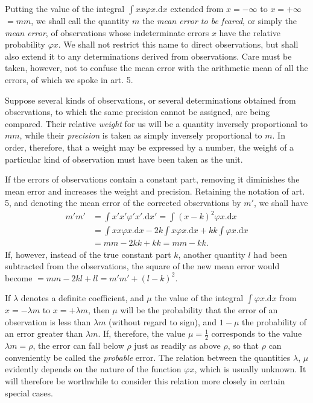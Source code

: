 Putting the value of the integral \(\int xx\varphi x.\mathrm{d}x\) extended from \(x=-\infty\) to \(x=+\infty\) \(=mm\), we shall call the quantity \(m\) the \textit{mean error to be feared}, or simply the \textit{mean error}, of observations whose indeterminate errors \(x\) have the relative probability \(\varphi x\). We shall not restrict this name to direct observations, but shall also extend it to any determinations derived from observations. Care must be taken, however, not to confuse the mean error with the arithmetic mean of all the errors, of which we spoke in art. 5.

Suppose several kinds of observations, or several determinations obtained from observations, to which the same precision cannot be assigned, are being compared. Their relative \textit{weight} for us will be a quantity inversely proportional to \(mm\), while their \textit{precision} is taken as simply inversely proportional to \(m\). In order, therefore, that a weight may be expressed by a number, the weight of a particular kind of observation must have been taken as the unit.

If the errors of observations contain a constant part, removing it diminishes the mean error and increases the weight and precision. Retaining the notation of art. 5, and denoting the mean error of the corrected observations by \(m'\), we shall have
\[
\begin{aligned}
m'm'&=\int x'x'\varphi'x'.\mathrm{d}x'=\int(x-k)^2\varphi x.\mathrm{d}x\\
&=\int xx\varphi x.\mathrm{d}x-2k\int x\varphi x.\mathrm{d}x+kk\int\varphi x.\mathrm{d}x\\
&=mm-2kk+kk=mm-kk.
\end{aligned}
\]
If, however, instead of the true constant part \(k\), another quantity \(l\) had been subtracted from the observations, the square of the new mean error would become \(=mm-2kl+ll=m'm'+(l-k)^2\).

If \(\lambda\) denotes a definite coefficient, and \(\mu\) the value of the integral \(\int\varphi x.\mathrm{d}x\) from \(x=-\lambda m\) to \(x=+\lambda m\), then \(\mu\) will be the probability that the error of an observation is less than \(\lambda m\) (without regard to sign), and \(1-\mu\) the probability of an error greater than \(\lambda m\). If, therefore, the value \(\mu=\tfrac12\) corresponds to the value \(\lambda m=\rho\), the error can fall below \(\rho\) just as readily as above \(\rho\), so that \(\rho\) can conveniently be called the \textit{probable} error. The relation between the quantities \(\lambda\), \(\mu\) evidently depends on the nature of the function \(\varphi x\), which is usually unknown. It will therefore be worthwhile to consider this relation more closely in certain special cases.

